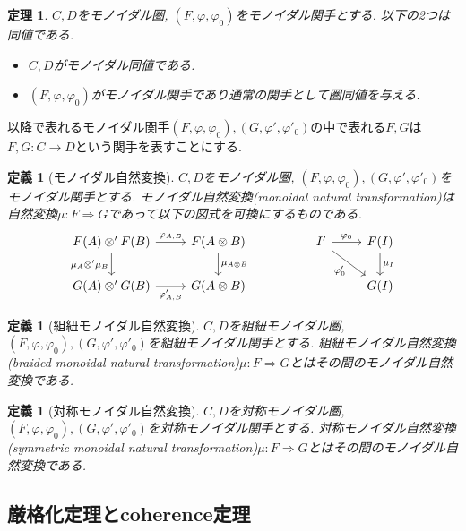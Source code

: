 \documentclass[a4paper,12pt]{ltjsarticle}
\theoremstyle{break}
\newtheorem{defn}[thm]{定義}
\newtheorem{thrm}[thm]{定理}
\newcommand{\vp}{\varphi}
\newcommand{\ra}{\Rightarrow}
\newcommand{\ot}{\otimes}
\numberwithin{equation}{section}
\begin{document}
\begin{thrm}
  $C,D$をモノイダル圏, $(F,\vp,\vp_0)$をモノイダル関手とする. 以下の2つは同値である. 
  \begin{itemize}
    \item $C,D$がモノイダル同値である. 
    \item $(F,\vp,\vp_0)$がモノイダル関手であり通常の関手として圏同値を与える. 
  \end{itemize}
\end{thrm}

以降で表れるモノイダル関手$(F,\vp,\vp_0),(G,\vp',\vp'_0)$の中で表れる$F,G$は$F,G: C \to D$という関手を表すことにする.

\begin{defn}[モノイダル自然変換]
  $C,D$をモノイダル圏, $(F,\vp,\vp_0),(G,\vp',\vp'_0)$をモノイダル関手とする. 
  モノイダル自然変換(monoidal natural transformation)は自然変換$\mu: F \ra G$であって以下の図式を可換にするものである. 
  \[\begin{tikzcd}
    {F(A) \ot' F(B)} & {F(A \ot B)} && {I'} & {F(I)} \\
    {G(A) \ot' G(B)} & {G(A \ot B)} &&& {G(I)}
    \arrow["{\mu_A \ot' \mu_B}"', from=1-1, to=2-1]
    \arrow["{\vp_{A,B}}", from=1-1, to=1-2]
    \arrow["{\mu_{A \ot B}}", from=1-2, to=2-2]
    \arrow["{\vp_{A,B}'}"', from=2-1, to=2-2]
    \arrow["{\vp_0}", from=1-4, to=1-5]
    \arrow["{\mu_I}", from=1-5, to=2-5]
    \arrow["{\vp_0'}"', from=1-4, to=2-5]
  \end{tikzcd}\]
\end{defn}

\begin{defn}[組紐モノイダル自然変換]
  $C,D$を組紐モノイダル圏, $(F,\vp,\vp_0),(G,\vp',\vp'_0)$を組紐モノイダル関手とする.  
  組紐モノイダル自然変換(braided monoidal natural transformation)$\mu: F \ra G$とはその間のモノイダル自然変換である. 
\end{defn}

\begin{defn}[対称モノイダル自然変換]
  $C,D$を対称モノイダル圏, $(F,\vp,\vp_0),(G,\vp',\vp'_0)$を対称モノイダル関手とする.  
  対称モノイダル自然変換(symmetric monoidal natural transformation)$\mu: F \ra G$とはその間のモノイダル自然変換である. 
\end{defn}

\subsection{厳格化定理とcoherence定理}
\end{document}
